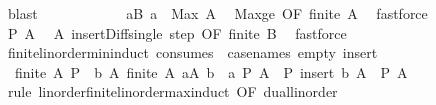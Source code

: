 \begin{isabellebody}
\ blast\isanewline
\ \ \ \ \isamarkupfalse%
\ \isanewline
\ \ \ \ \isamarkupfalse%
\ {\isachardoublequoteopen}{\isasymforall}a{\isasymin}{\isacharquery}{\kern0pt}B{\isachardot}{\kern0pt}\ a\ {\isacharless}{\kern0pt}\ Max\ A{\isachardoublequoteclose}\ \isamarkupfalse%
\ Max{\isacharunderscore}{\kern0pt}ge\ {\isacharbrackleft}{\kern0pt}OF\ {\isacartoucheopen}finite\ A{\isacartoucheclose}{\isacharbrackright}{\kern0pt}\ \isamarkupfalse%
\ fastforce\isanewline
\ \ \ \ \isamarkupfalse%
\ \isamarkupfalse%
\ {\isachardoublequoteopen}P\ A{\isachardoublequoteclose}\ \isamarkupfalse%
\ A\ insert{\isacharunderscore}{\kern0pt}Diff{\isacharunderscore}{\kern0pt}single\ step\ {\isacharbrackleft}{\kern0pt}OF\ {\isacartoucheopen}finite\ {\isacharquery}{\kern0pt}B{\isacartoucheclose}{\isacharbrackright}{\kern0pt}\ \isamarkupfalse%
\ fastforce\isanewline
\ \ \isamarkupfalse%
\isanewline
{}\isamarkupfalse%
%
\endisatagproof
{\isafoldproof}%
%
\isadelimproof
\isanewline
%
\endisadelimproof
\isanewline
{}\isamarkupfalse%
\ finite{\isacharunderscore}{\kern0pt}linorder{\isacharunderscore}{\kern0pt}min{\isacharunderscore}{\kern0pt}induct\ {\isacharbrackleft}{\kern0pt}consumes\ {}{\isacharcomma}{\kern0pt}\ case{\isacharunderscore}{\kern0pt}names\ empty\ insert{\isacharbrackright}{\kern0pt}{\isacharcolon}{\kern0pt}\isanewline
\ \ {\isachardoublequoteopen}{\isasymlbrakk}finite\ A{\isacharsemicolon}{\kern0pt}\ P\ {\isacharbraceleft}{\kern0pt}{\isacharbraceright}{\kern0pt}{\isacharsemicolon}{\kern0pt}\ {\isasymAnd}b\ A{\isachardot}{\kern0pt}\ {\isasymlbrakk}finite\ A{\isacharsemicolon}{\kern0pt}\ {\isasymforall}a{\isasymin}A{\isachardot}{\kern0pt}\ b\ {\isacharless}{\kern0pt}\ a{\isacharsemicolon}{\kern0pt}\ P\ A{\isasymrbrakk}\ {\isasymLongrightarrow}\ P\ {\isacharparenleft}{\kern0pt}insert\ b\ A{\isacharparenright}{\kern0pt}{\isasymrbrakk}\ {\isasymLongrightarrow}\ P\ A{\isachardoublequoteclose}\isanewline
%
\isadelimproof
\ \ %
\endisadelimproof
%
\isatagproof
{}\isamarkupfalse%
\ {\isacharparenleft}{\kern0pt}rule\ linorder{\isachardot}{\kern0pt}finite{\isacharunderscore}{\kern0pt}linorder{\isacharunderscore}{\kern0pt}max{\isacharunderscore}{\kern0pt}induct\ {\isacharbrackleft}{\kern0pt}OF\ dual{\isacharunderscore}{\kern0pt}linorder{\isacharbrackright}{\kern0pt}{\isacharparenright}{\kern0pt}%
\endisatagproof
{\isafoldproof}%
%
\isadelimproof
\isanewline
%
\endisadelimproof

\end{isabellebody}
